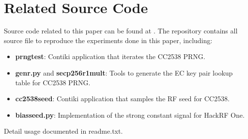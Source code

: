 \section{Related Source Code}

Source code related to this paper can be found at \cite{cc2538rng}. The repository contains all source file to reproduce the experiments done in this paper, including:
\begin{itemize}
	\item \textbf{prngtest}: Contiki application that iterates the CC2538 PRNG.
	\item \textbf{genr.py} and \textbf{secp256r1mult}: Tools to generate the EC key pair lookup table for CC2538 PRNG.
	\item \textbf{cc2538seed}: Contiki application that samples the RF seed for CC2538.
	\item \textbf{biasseed.py}: Implementation of the strong constant signal for HackRF One.
\end{itemize}

Detail usage documented in readme.txt.